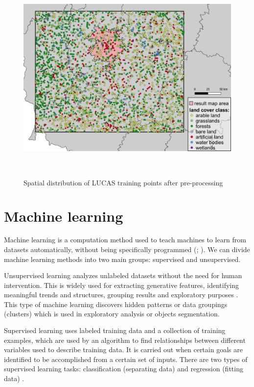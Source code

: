 \documentclass{amuthesis}
\begin{document}
\begin{figure}[t]

{\centering \includegraphics[width=1\textwidth,height=4.16667in]{./figures/lucas_distribution.png}

}

\caption{\label{fig-rycina3}Spatial distribution of LUCAS training
points after pre-processing}

\end{figure}

\hypertarget{sec-ml}{%
\section{Machine learning}\label{sec-ml}}

Machine learning is a computation method used to teach machines to learn
from datasets automatically, without being specifically programmed
(\textcite{mahesh_machine_2018}; \textcite{sarker_machine_2021}). We can
divide machine learning methods into two main groups: supervised and
unsupervised.

Unsupervised learning analyzes unlabeled datasets without the need for
human intervention. This is widely used for extracting generative
features, identifying meaningful trends and structures, grouping results
and exploratory purposes \autocite{sarker_machine_2021}. This type of
machine learning discovers hidden patterns or data groupings (clusters)
which is used in exploratory analysis or objects segmentation.

Supervised learning uses labeled training data and a collection of
training examples, which are used by an algorithm to find relationships
between different variables used to describe training data. It is
carried out when certain goals are identified to be accomplished from a
certain set of inputs. There are two types of supervised learning tasks:
classification (separating data) and regression (fitting data)
\autocite{sarker_machine_2021}.
\end{document}
